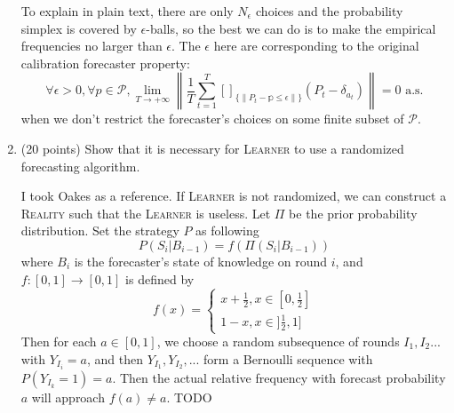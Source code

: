\documentclass[a4paper, 12pt]{article}
\begin{document}
\begin{enumerate}
{    To explain in plain text, there are only $N_\epsilon$ choices and the probability simplex is covered by $\epsilon$-balls, so the best we can do is to make the empirical frequencies no larger than $\epsilon$. The $\epsilon$ here are corresponding to the original calibration forecaster property:
    \[\forall \epsilon > 0, \forall p \in \mathscr{P}, \lim_{T \to +\infty} \left\lVert \frac{1}{T} \sum_{t=1}^T []_{\{\lVert P_t - \mathbb{p} \leq \epsilon \rVert\}}(P_t - \delta_{a_t})\right\rVert = 0 \text{ a.s.}\]
    when we don't restrict the forecaster's choices on some finite subset of $\mathscr{P}$.
    }
    \item (20 points) Show that it is necessary for \textsc{Learner} to use a randomized forecasting algorithm.
    \par {\color{blue} I took Oakes\cite{oakes1985self} as a reference. If \textsc{Learner} is not randomized, we can construct a \textsc{Reality} such that the \textsc{Learner} is useless. Let $\Pi$ be the prior probability distribution. Set the strategy $P$ as following \[P(S_i | B_{i-1}) = f(\Pi (S_i | B_{i-1}))\] where $B_i$ is the forecaster's state of knowledge on round $i$, and $f: [0, 1] \to [0, 1]$ is defined by \[f(x) = \begin{cases}x+\frac{1}{2}, x \in [0, \frac{1}{2}] \\ 1 - x, x \in ]\frac{1}{2}, 1]\end{cases}\]
    Then for each $a \in [0, 1]$, we choose a random subsequence of rounds $I_1, I_2 ...$ with $Y_{I_i} = a$, and then $Y_{I_1}, Y_{I_2}, ...$ form a Bernoulli sequence with $P(Y_{I_k} = 1) = a$. Then the actual relative frequency with forecast probability $a$ will approach $f(a) \neq a$.
    TODO}


\end{enumerate}
\end{document}
